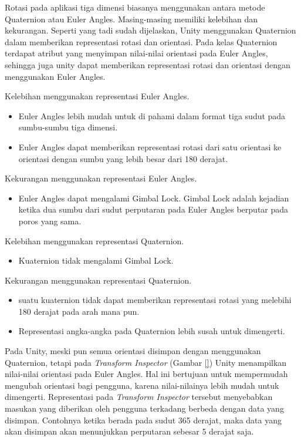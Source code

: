  Rotasi pada aplikasi tiga dimensi biasanya menggunakan antara metode Quaternion atau Euler Angles. Masing-masing memiliki kelebihan dan kekurangan. Seperti yang tadi sudah dijelaskan, Unity menggunakan Quaternion dalam memberikan representasi rotasi dan orientasi. Pada kelas Quaternion terdapat atribut yang menyimpan nilai-nilai orientasi pada Euler Angles, sehingga juga unity dapat memberikan representasi rotasi dan orientasi dengan menggunakan Euler Angles.
 
 Kelebihan menggunakan representasi Euler Angles.
 \begin{itemize}
     \item Euler Angles lebih mudah untuk di pahami dalam format tiga sudut pada sumbu-sumbu tiga dimensi.
     \item Euler Angles dapat memberikan representasi rotasi dari satu orientasi ke orientasi dengan sumbu yang lebih besar dari 180 derajat. 
 \end{itemize}
 Kekurangan menggunakan representasi Euler Angles.
 \begin{itemize}
     \item Euler Angles dapat mengalami Gimbal Lock. Gimbal Lock adalah kejadian ketika dua sumbu dari sudut perputaran pada Euler Angles berputar pada poros yang sama.
 \end{itemize}
 
 Kelebihan menggunakan representasi Quaternion.
 \begin{itemize}
     \item Kuaternion tidak mengalami Gimbal Lock.
 \end{itemize}
 Kekurangan menggunakan representasi Quaternion.
 \begin{itemize}
     \item suatu kuaternion tidak dapat memberikan representasi rotasi yang melebihi 180 derajat pada arah mana pun.
     \item Representasi angka-angka pada Quaternion lebih susah untuk dimengerti.
 \end{itemize}
 
 Pada Unity, meski pun semua orientasi disimpan dengan menggunakan Quaternion, tetapi pada \textit{Transform Inspector} (Gambar \ref{}) Unity menampilkan nilai-nilai orientasi pada Euler Angles. Hal ini bertujuan untuk mempermudah mengubah orientasi bagi pengguna, karena nilai-nilainya lebih mudah untuk dimengerti. Representasi pada \textit{Transform Inspector} tersebut menyebabkan masukan yang diberikan oleh pengguna terkadang berbeda dengan data yang disimpan. Contohnya ketika berada pada sudut 365 derajat, maka data yang akan disimpan akan menunjukkan perputaran sebesar 5 derajat saja.
 
